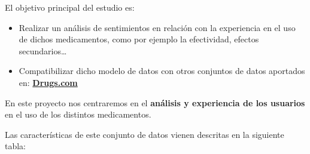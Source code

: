 \documentclass[spanish,]{article}
\begin{document}
El objetivo principal del estudio es:

\begin{itemize}
\item
  Realizar un análisis de sentimientos en relación con la experiencia en
  el uso de dichos medicamentos, como por ejemplo la efectividad,
  efectos secundarios\ldots{}
\item
  Compatibilizar dicho modelo de datos con otros conjuntos de datos
  aportados en: \href{https://www.drugs.com/}{\textbf{Drugs.com}}
\end{itemize}

En este proyecto nos centraremos en el \textbf{análisis y experiencia de
los usuarios} en el uso de los distintos medicamentos.

Las características de este conjunto de datos vienen descritas en la
siguiente tabla:
\end{document}
